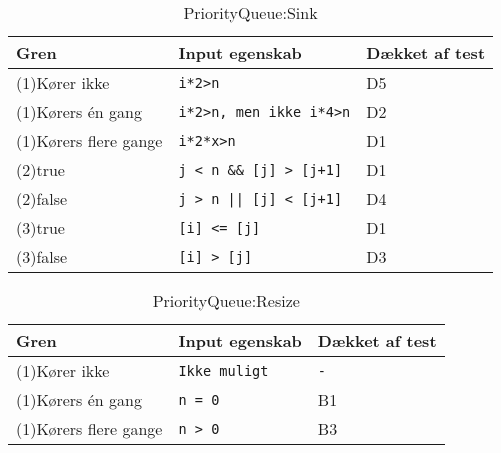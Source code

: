 \begin{table}[!h]
	\caption{PriorityQueue:Sink}
	\centering
	\begin{tabular}{L L L}
		\hline\hline
		Gren & Input egenskab & Dækket af test\\ [0.5ex]
		\hline
		(1)Kører ikke & \verb?i*2>n? & D5\\
		(1)Kørers én gang & \verb?i*2>n, men ikke i*4>n? & D2\\
		(1)Kørers flere gange & \verb?i*2*x>n? & D1\\
		(2)true & \verb?j < n && [j] > [j+1]? & D1\\
		(2)false & \verb?j > n || [j] < [j+1]? & D4\\
		(3)true & \verb?[i] <= [j]? & D1\\
		(3)false & \verb?[i] > [j]? & D3\\
		\hline
	\end{tabular}
\end{table}

\begin{table}[!h]
	\caption{PriorityQueue:Resize}
	\centering
	\begin{tabular}{L L L}
		\hline\hline
		Gren & Input egenskab & Dækket af test\\ [0.5ex]
		\hline
		(1)Kører ikke & \verb?Ikke muligt? & \verb?-?\\
		(1)Kørers én gang & \verb?n = 0? & B1\\
		(1)Kørers flere gange & \verb?n > 0? & B3\\
		\hline
	\end{tabular}
\end{table}